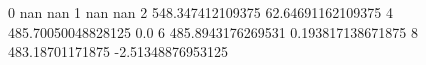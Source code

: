 0 nan nan
1 nan nan
2 548.347412109375 62.64691162109375
4 485.70050048828125 0.0
6 485.8943176269531 0.193817138671875
8 483.18701171875 -2.51348876953125
